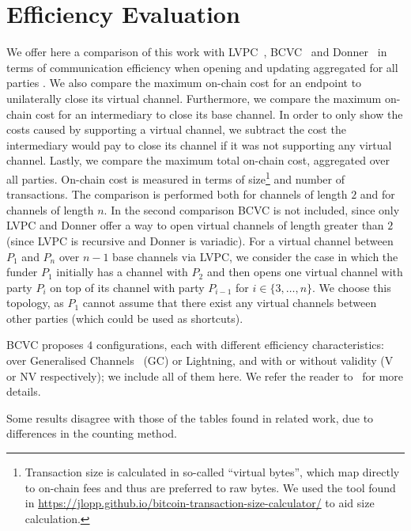 \section{Efficiency Evaluation}
  \label{section:comparison}
  We offer here a comparison of this work with
  LVPC~\cite{10.1007/978-3-030-65411-5_18}, BCVC~\cite{cryptoeprint:2020:554}
  and Donner~\cite{donner} in terms of communication efficiency when opening and
  updating aggregated for all parties . We also compare
  the maximum on-chain cost for an endpoint to unilaterally close its virtual
  channel. Furthermore, we compare the maximum on-chain cost for an intermediary
  to close its base channel. In order to only show the costs caused by
  supporting a virtual channel, we subtract the cost the intermediary would pay
  to close its channel if it was not supporting any virtual channel. Lastly, we
  compare the maximum total on-chain cost, aggregated over all parties. On-chain
  cost is measured in terms of size\footnote{Transaction size is calculated in
  so-called ``virtual bytes'', which map directly to on-chain fees and thus are
  preferred to raw bytes. We used the tool found in
  \url{https://jlopp.github.io/bitcoin-transaction-size-calculator/} to aid size
  calculation.} and number of transactions. The comparison is performed both for
  channels of length $2$ and for channels of length $n$. In the second
  comparison BCVC is not included, since only LVPC and Donner offer a way to
  open virtual channels of length greater than $2$ (since LVPC is recursive and
  Donner is variadic). For a virtual channel between $P_1$ and $P_n$ over $n-1$
  base channels via LVPC, we consider the case in which the funder $P_1$
  initially has a channel with $P_2$ and then opens one virtual channel with
  party $P_i$ on top of its channel with party $P_{i-1}$ for $i \in \{3, \dots,
  n\}$. We choose this topology, as $P_1$ cannot assume that there exist any
  virtual channels between other parties (which could be used as shortcuts).

  BCVC proposes $4$ configurations, each with different efficiency
  characteristics: over Generalised Channels~\cite{cryptoeprint:2020:476} (GC)
  or Lightning, and with or without validity (V or NV respectively); we include
  all of them here. We refer the reader to~\cite{cryptoeprint:2020:554} for more
  details.

  Some results disagree with those of the tables found in related work, due to
  differences in the counting method.

